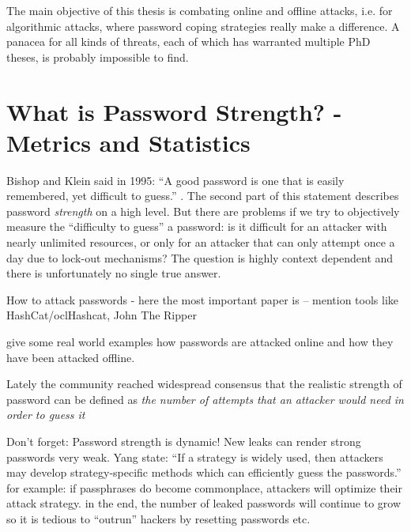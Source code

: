 
The main objective of this thesis is combating online and offline attacks, i.e. for algorithmic attacks, where password coping strategies really make a difference. A panacea for all kinds of threats, each of which has warranted multiple PhD theses, is probably impossible to find. 



\section{What is Password Strength? - Metrics and Statistics}\label{sec:rw:pw_strength_metrics}
Bishop and Klein said in 1995: ``A good password is one that is easily remembered, yet difficult to guess.'' \cite[p. 231]{Bishop1995ProactivePasswordChecking}. The second part of this statement describes password \textit{strength} on a high level. But there are problems if we try to objectively measure the ``difficulty to guess'' a password: is it difficult for an attacker with nearly unlimited resources, or only for an attacker that can only attempt once a day due to lock-out mechanisms? The question is highly context dependent and there is unfortunately no single true answer. 

How to attack passwords
- here the most important paper is \cite{Ur2015MeasuringRealWorldAccuracies} -- mention tools like HashCat/oclHashcat, John The Ripper 

give some real world examples how passwords are attacked online and how they have been attacked offline. 


Lately the community reached widespread consensus that the realistic strength of password can be defined as \textit{the number of attempts that an attacker would need in order to guess it} \cite{Dellamico2015MonteCarlo}

 

Don't forget: Password strength is dynamic! New leaks can render strong passwords very weak. Yang \etal state: ``If a strategy is widely used, then attackers may develop strategy-specific methods which can efficiently guess the passwords.'' for example: if passphrases do become commonplace, attackers will optimize their attack strategy. in the end, the number of leaked passwords will continue to grow so it is tedious to ``outrun'' hackers by resetting passwords etc.

